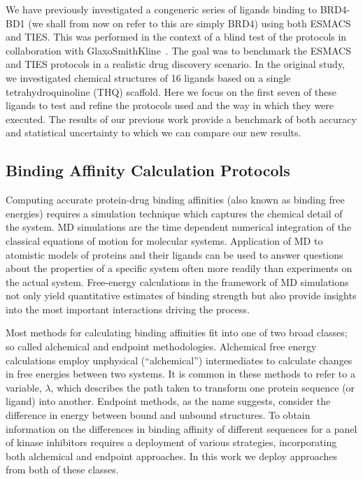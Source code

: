 \documentclass[conference]{IEEEtran}
\begin{document}
We have previously investigated a congeneric series of ligands binding to
BRD4-BD1 (we shall from now on refer to this are simply BRD4) using both
ESMACS and TIES. This was performed in the context of a blind test of the
protocols in collaboration with GlaxoSmithKline~\cite{Wan2017brd4}. The goal
was to benchmark the ESMACS and TIES protocols in a realistic drug discovery
scenario. In the original study, we investigated chemical structures of 16
ligands based on a single tetrahydroquinoline (THQ) scaffold. %
Here we focus on the first seven of these ligands to test
and refine the protocols used and the way in which they were executed. The
results of our previous work provide a benchmark of both accuracy and
statistical uncertainty to which we can compare our new results.

\subsection{Binding Affinity Calculation Protocols}\label{sec:bac}

Computing accurate protein-drug binding affinities (also known as binding free energies) requires a simulation technique which captures the chemical detail of the system. 
MD simulations are the time dependent numerical integration of the classical equations of motion for molecular systems. 
Application of MD to atomistic models of proteins and their ligands can be used to answer questions about the properties of a specific system often more readily than experiments on the actual system. 
Free-energy calculations in the framework of MD simulations not only yield quantitative estimates of binding strength but also provide insights into the most important interactions driving the process.

Most methods for calculating binding affinities fit into one of two broad classes; so called alchemical and endpoint methodologies. 
Alchemical free energy calculations employ unphysical (“alchemical”) intermediates to calculate changes in free energies between two systems. 
It is common in these methods to refer to a variable, $\lambda$, which describes the path taken to transform one protein sequence (or ligand) into another. 
Endpoint methods, as the name suggests, consider the difference in energy between bound and unbound structures. 
To obtain information on the differences in binding affinity of different sequences for a panel of kinase inhibitors requires a deployment of various strategies, incorporating both alchemical and endpoint approaches. 
In this work we deploy approaches from both of these classes.
\end{document}
